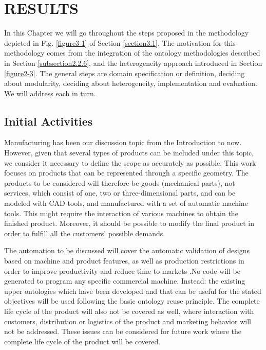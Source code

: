 \chapter{RESULTS}\label{chapter4}

In this Chapter we will go throughout the steps proposed in the methodology depicted in Fig. \ref{figure3-1} of Section \ref{section3.1}. The motivation for this methodology comes from the integration of the ontology methodologies described in Section \ref{subsection2.2.6}, and the heterogeneity approach introduced in Section \ref{figure2-3}. The general steps are domain specification or definition, deciding about modularity, deciding about heterogeneity, implementation and evaluation. We will address each in turn. 



\section{Initial Activities }\label{section4.1}

Manufacturing has been our discussion topic from the Introduction to now. However, given that several types of products can be included under this topic, we consider it necessary to define the scope as accurately as possible. This work  focuses on products that can be represented through a specific geometry. The products to be considered will therefore be goods (mechanical parts), not services, which consist of one, two or three-dimensional parts, and can be modeled with CAD tools, and manufactured with a set of automatic machine tools. This might require the interaction of various machines to obtain the finished product. Moreover, it should be possible to modify the final product in order to fulfill all the customers’ possible demands.

The automation to be discussed will cover the automatic validation of designs based on machine and product features, as well as production restrictions  in order to improve productivity and reduce time to markets \citep{dorr_cad-cam_1987}.No code will be generated to program any specific commercial machine. Instead: the existing upper ontologies which have been developed and that can be useful for the stated objectives will be used following the basic ontology reuse principle. The complete life cycle of the product will also not be covered as well, where  interaction with customers, distribution or logistics of the product and marketing behavior will not be addressed. These issues can be considered for future work where the complete life cycle of the product will be covered.

